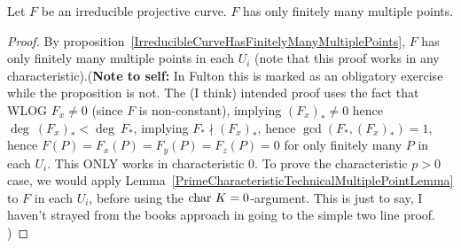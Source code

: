     \begin{proposition}
        Let $F$ be an irreducible projective curve. $F$ has only finitely many multiple points.
    \end{proposition}
    \begin{proof}
        By proposition~\ref{IrreducibleCurveHasFinitelyManyMultiplePoints}, $F$ has only finitely many multiple points in each $U_i$ (note that this proof works in any characteristic).\newline (\textbf{Note to self:} In Fulton this is marked as an obligatory exercise while the proposition is not. The (I think) intended proof uses the fact that WLOG $F_x\neq 0$ (since $F$ is non-constant), implying $(F_x)_\ast \neq 0$ hence $\deg \ (F_x)_\ast < \deg \ F_\ast$, implying $F_\ast \nmid (F_x)_\ast$, hence $\gcd(F_\ast,(F_x)_\ast)=1$, hence $F(P)=F_x(P)=F_y(P)=F_z(P)=0$ for only finitely many $P$ in each $U_i$. This ONLY works in characteristic $0$. To prove the characteristic $p>0$ case, we would apply Lemma~\ref{PrimeCharacteristicTechnicalMultiplePointLemma} to $F$ in each $U_i$, before using the $\mathrm{char}\ K =0 $-argument. This is just to say, I haven't strayed from the books approach in going to the simple two line proof. )
    \end{proof}
